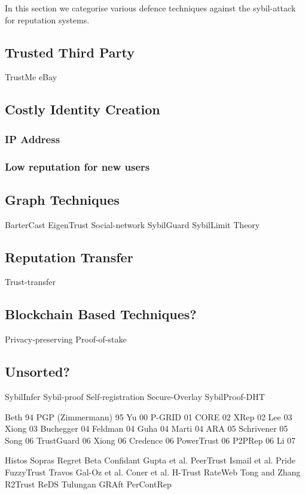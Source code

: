 In this section we categorise various defence techniques against the
sybil-attack for reputation systems.

\subsection{Trusted Third Party}\label{sec:trusted_party}
TrustMe\cite{singh2003trustme}
eBay\cite{resnick2002trust}

\subsection{Costly Identity Creation}\label{sec:costly_id}
\subsubsection{IP Address}
\subsubsection{Low reputation for new users}

\subsection{Graph Techniques}\label{sec:graph}
BarterCast\cite{meulpolder2009bartercast}
EigenTrust\cite{kamvar2003eigentrust}
Social-network\cite{viswanath2010analysis}
SybilGuard\cite{yu2006sybilguard}
SybilLimit\cite{yu2008sybillimit}
Theory\cite{seuken2011sybil}

\subsection{Reputation Transfer}
Trust-transfer\cite{seigneur2005trust}

\subsection{Blockchain Based Techniques?}
Privacy-preserving\cite{schaub2016trustless}
Proof-of-stake\cite{dennis2016rep}

\subsection{Unsorted?}
SybilInfer\cite{danezis2009sybilinfer}
Sybil-proof\cite{cheng2005sybilproof}
Self-registration\cite{dinger2006defending}
Secure-Overlay\cite{lua2007securing}
SybilProof-DHT\cite{lesniewski2010whanau}

Beth 94
PGP (Zimmermann) 95
Yu 00
P-GRID 01
CORE 02
XRep 02
Lee 03
Xiong 03
Buchegger 04
Feldman 04
Guha 04
Marti 04
ARA 05
Schrivener 05
Song 06
TrustGuard 06
Xiong 06
Credence 06
PowerTrust 06
P2PRep 06
Li 07

Histos
Sopras
Regret
Beta
Confidant
Gupta et al.
PeerTrust
Ismail et al.
Pride
FuzzyTrust
Travos
Gal-Oz et al.
Coner et al.
H-Trust
RateWeb
Tong and Zhang
R2Trust
ReDS
Tulungan
GRAft
PerContRep





